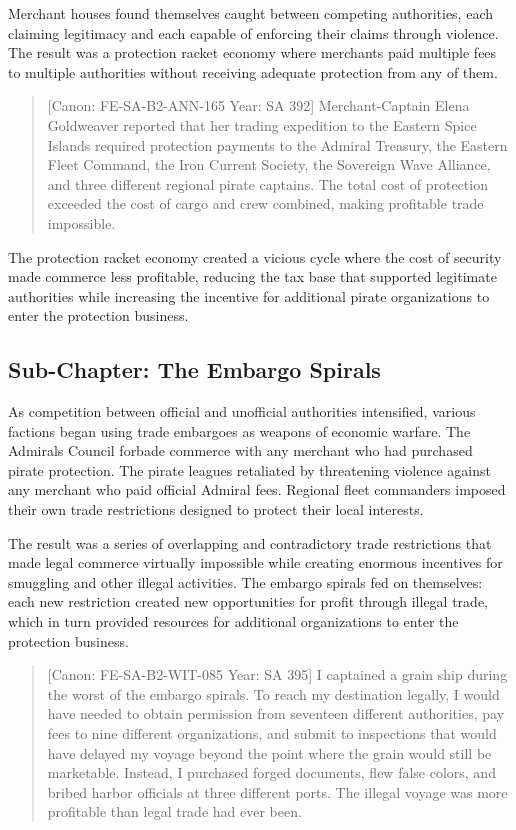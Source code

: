 Merchant houses found themselves caught between competing authorities,
each claiming legitimacy and each capable of enforcing their claims
through violence. The result was a protection racket economy where
merchants paid multiple fees to multiple authorities without receiving
adequate protection from any of them.

\begin{quote}
{[}Canon: FE-SA-B2-ANN-165 \textbar{} Year: SA 392{]} Merchant-Captain
Elena Goldweaver reported that her trading expedition to the Eastern
Spice Islands required protection payments to the Admiral Treasury, the
Eastern Fleet Command, the Iron Current Society, the Sovereign Wave
Alliance, and three different regional pirate captains. The total cost
of protection exceeded the cost of cargo and crew combined, making
profitable trade impossible.
\end{quote}

The protection racket economy created a vicious cycle where the cost of
security made commerce less profitable, reducing the tax base that
supported legitimate authorities while increasing the incentive for
additional pirate organizations to enter the protection business.

\subsection{Sub-Chapter: The Embargo
Spirals}\label{sub-chapter-the-embargo-spirals}

As competition between official and unofficial authorities intensified,
various factions began using trade embargoes as weapons of economic
warfare. The Admiral\textquotesingle s Council forbade commerce with any
merchant who had purchased pirate protection. The pirate leagues
retaliated by threatening violence against any merchant who paid
official Admiral fees. Regional fleet commanders imposed their own trade
restrictions designed to protect their local interests.

The result was a series of overlapping and contradictory trade
restrictions that made legal commerce virtually impossible while
creating enormous incentives for smuggling and other illegal activities.
The embargo spirals fed on themselves: each new restriction created new
opportunities for profit through illegal trade, which in turn provided
resources for additional organizations to enter the protection business.

\begin{quote}
{[}Canon: FE-SA-B2-WIT-085 \textbar{} Year: SA 395{]} I captained a
grain ship during the worst of the embargo spirals. To reach my
destination legally, I would have needed to obtain permission from
seventeen different authorities, pay fees to nine different
organizations, and submit to inspections that would have delayed my
voyage beyond the point where the grain would still be marketable.
Instead, I purchased forged documents, flew false colors, and bribed
harbor officials at three different ports. The illegal voyage was more
profitable than legal trade had ever been.
\end{quote}

